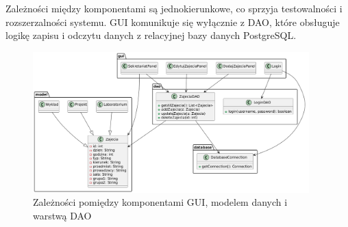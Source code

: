 Zależności między komponentami są jednokierunkowe, co sprzyja testowalności i rozszerzalności systemu. GUI komunikuje się wyłącznie z DAO, które obsługuje logikę zapisu i odczytu danych z relacyjnej bazy danych PostgreSQL.

\begin{figure}[H]
    \centering
    \includegraphics[width=0.95\textwidth]{figures/diagram.png}
    \caption{Zależności pomiędzy komponentami GUI, modelem danych i warstwą DAO}
    \label{fig:diagram-gui}
\end{figure}
